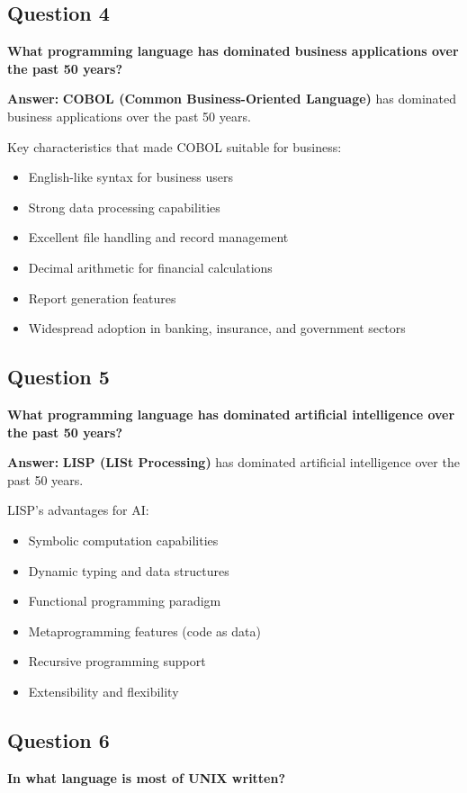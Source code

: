 \documentclass[11pt,a4paper]{article}
\begin{document}
\subsection{Question 4}
\textbf{What programming language has dominated business applications over the past 50 years?}

\textbf{Answer:}
\textbf{COBOL (Common Business-Oriented Language)} has dominated business applications over the past 50 years.

Key characteristics that made COBOL suitable for business:
\begin{itemize}
\item English-like syntax for business users
\item Strong data processing capabilities
\item Excellent file handling and record management
\item Decimal arithmetic for financial calculations
\item Report generation features
\item Widespread adoption in banking, insurance, and government sectors
\end{itemize}

\subsection{Question 5}
\textbf{What programming language has dominated artificial intelligence over the past 50 years?}

\textbf{Answer:}
\textbf{LISP (LISt Processing)} has dominated artificial intelligence over the past 50 years.

LISP's advantages for AI:
\begin{itemize}
\item Symbolic computation capabilities
\item Dynamic typing and data structures
\item Functional programming paradigm
\item Metaprogramming features (code as data)
\item Recursive programming support
\item Extensibility and flexibility
\end{itemize}

\subsection{Question 6}
\textbf{In what language is most of UNIX written?}
\end{document}
